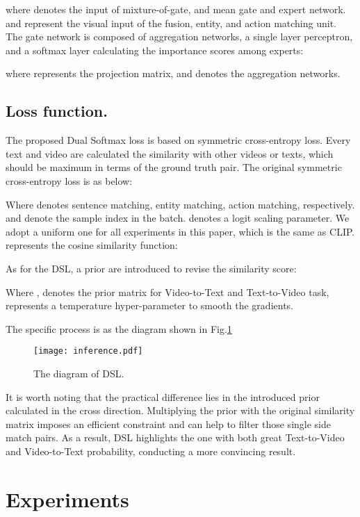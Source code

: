 \documentclass[letterpaper]{article} \usepackage{aaai22}  \usepackage{times}  \usepackage{helvet}  \usepackage{courier}  \usepackage[hyphens]{url}  \usepackage{graphicx} \urlstyle{rm} \def\UrlFont{\rm}  \usepackage{natbib}  \usepackage{caption}
\begin{document}
where  denotes the input of mixture-of-gate,  and  mean gate and expert network.  and  represent the visual input of the fusion, entity, and action matching unit.
The gate network is composed of aggregation networks, a single layer perceptron, and a softmax layer calculating the importance scores among experts:

where  represents the projection matrix, and  denotes the aggregation networks.


\subsection{Loss function.}
The proposed Dual Softmax loss is based on symmetric cross-entropy loss. Every text and video are calculated the similarity with other videos or texts, which should be maximum in terms of the ground truth pair. The original symmetric cross-entropy loss is as below:

Where  denotes sentence matching, entity matching, action matching, respectively.  and  denote the sample index in the batch.  denotes a logit scaling parameter. We adopt a uniform one for all experiments in this paper, which is the same as CLIP.  represents the cosine similarity function:

As for the DSL, a prior are introduced to revise the similarity score:

Where ,  denotes the prior matrix for Video-to-Text and Text-to-Video task,  represents a temperature hyper-parameter to smooth the gradients. 

The specific process is as the diagram shown in Fig.\ref{cross_softmax}

\begin{figure}[h]
\begin{center}
\texttt{[image: inference.pdf]}
\end{center}
\caption{The diagram of DSL.}
\label{cross_softmax}
\end{figure}

It is worth noting that the practical difference lies in the introduced prior calculated in the cross direction. Multiplying the prior with the original similarity matrix imposes an efficient constraint and can help to filter those single side match pairs. As a result, DSL highlights the one with both great Text-to-Video and Video-to-Text probability, conducting a more convincing result.


\section{Experiments}
\end{document}
